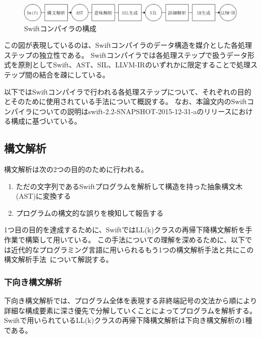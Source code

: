 \begin{figure}
    \begin{center}
        \includegraphics[scale=0.5]{./img/swift_compiler_process.png}
        \caption{Swiftコンパイラの構成}
        \label{img:swift-compiler-process}
    \end{center}
\end{figure}

この図が表現しているのは、Swiftコンパイラのデータ構造を媒介とした各処理ステップの独立性である。
Swiftコンパイラでは各処理ステップで扱うデータ形式を原則としてSwift、AST、SIL、LLVM-IRのいずれかに限定することで処理ステップ間の結合を疎にしている。

以下ではSwiftコンパイラで行われる各処理ステップについて、それぞれの目的とそのために使用されている手法について概説する。
なお、本論文内のSwiftコンパイラについての説明はswift-2.2-SNAPSHOT-2015-12-31-aのリリースにおける構成に基づいている。

\subsection{構文解析}
\label{refinement:structure:parser}

構文解析は次の2つの目的のために行われる。

\begin{enumerate}
    \item ただの文字列であるSwiftプログラムを解析して構造を持った抽象構文木(AST)に変換する
    \item プログラムの構文的な誤りを検知して報告する
\end{enumerate}

1つ目の目的を達成するために、SwiftではLL(k)クラスの再帰下降構文解析を手作業で構築して用いている。
この手法についての理解を深めるために、以下では近代的なプログラミング言語に用いられるもう1つの構文解析手法と共にこの構文解析手法~\cite{dragonbook}について解説する。

\subsubsection{下向き構文解析}

下向き構文解析では、プログラム全体を表現する非終端記号の文法から順により詳細な構成要素に深さ優先で分解していくことによってプログラムを解析する。
Swiftで用いられているLL(k)クラスの再帰下降構文解析は下向き構文解析の1種である。

